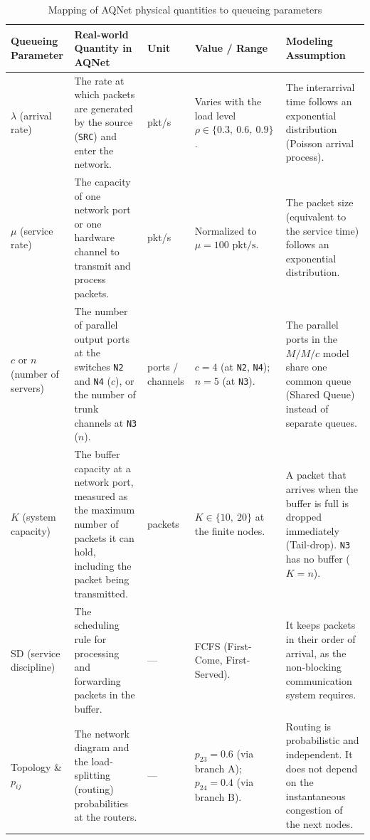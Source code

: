 \begin{table}[H]
\centering
\small
\begin{tabular}{|p{2.3cm}|p{3.6cm}|p{1.5cm}|p{3.3cm}|p{4.1cm}|}
\hline
\textbf{Queueing Parameter} & \textbf{Real-world Quantity in AQNet} & \textbf{Unit} & \textbf{Value / Range} & \textbf{Modeling Assumption} \\
\hline
$\lambda$ (arrival rate) &
The rate at which packets are generated by the source (\texttt{SRC}) and enter the network. &
pkt/s &
Varies with the load level $\rho \in \{0.3,\ 0.6,\ 0.9\}$. &
The interarrival time follows an exponential distribution (Poisson arrival process). \\
\hline
$\mu$ (service rate) &
The capacity of one network port or one hardware channel to transmit and process packets. &
pkt/s &
Normalized to $\mu = 100\text{ pkt/s}$. &
The packet size (equivalent to the service time) follows an exponential distribution. \\
\hline
$c$ or $n$ (number of servers) &
The number of parallel output ports at the switches \texttt{N2} and \texttt{N4} ($c$), or the number of trunk channels at \texttt{N3} ($n$). &
ports / channels &
$c = 4$ (at \texttt{N2}, \texttt{N4}); $n = 5$ (at \texttt{N3}). &
The parallel ports in the $M/M/c$ model share one common queue (Shared Queue) instead of separate queues. \\
\hline
$K$ (system capacity) &
The buffer capacity at a network port, measured as the maximum number of packets it can hold, including the packet being transmitted. &
packets &
$K \in \{10,\ 20\}$ at the finite nodes. &
A packet that arrives when the buffer is full is dropped immediately (Tail-drop). \texttt{N3} has no buffer ($K = n$). \\
\hline
SD (service discipline) &
The scheduling rule for processing and forwarding packets in the buffer. &
--- &
FCFS (First-Come, First-Served). &
It keeps packets in their order of arrival, as the non-blocking communication system requires. \\
\hline
Topology \& $p_{ij}$ &
The network diagram and the load-splitting (routing) probabilities at the routers. &
--- &
$p_{23} = 0.6$ (via branch A); $p_{24} = 0.4$ (via branch B). &
Routing is probabilistic and independent. It does not depend on the instantaneous congestion of the next nodes. \\
\hline
\end{tabular}
\caption{Mapping of AQNet physical quantities to queueing parameters}
\label{tab:aqnet-params}
\end{table}


